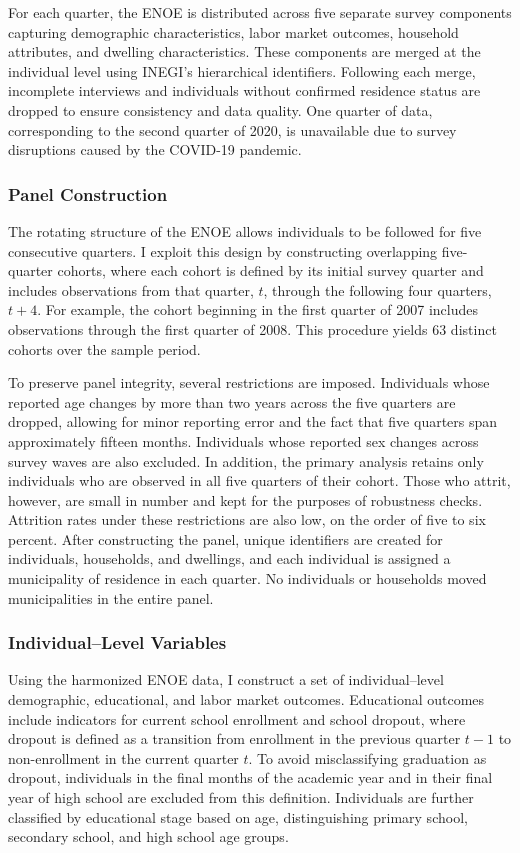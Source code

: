\documentclass[12pt,letter,english,intoc,bibliography=totoc,index=totoc,BCOR10mm,captions=tableheading,nottitlepage,fleqn]{article}
\theoremstyle{break}
\begin{document}
For each quarter, the ENOE is distributed across five separate survey components capturing demographic characteristics, labor market outcomes, household attributes, and dwelling characteristics. These components are merged at the individual level using INEGI's hierarchical identifiers. Following each merge, incomplete interviews and individuals without confirmed residence status are dropped to ensure consistency and data quality. One quarter of data, corresponding to the second quarter of 2020, is unavailable due to survey disruptions caused by the COVID-19 pandemic.

\subsubsection*{Panel Construction}
The rotating structure of the ENOE allows individuals to be followed for five consecutive quarters. I exploit this design by constructing overlapping five-quarter cohorts, where each cohort is defined by its initial survey quarter and includes observations from that quarter, $t$, through the following four quarters, $t+4$. For example, the cohort beginning in the first quarter of 2007 includes observations through the first quarter of 2008. This procedure yields 63 distinct cohorts over the sample period.

To preserve panel integrity, several restrictions are imposed. Individuals whose reported age changes by more than two years across the five quarters are dropped, allowing for minor reporting error and the fact that five quarters span approximately fifteen months. Individuals whose reported sex changes across survey waves are also excluded. In addition, the primary analysis retains only individuals who are observed in all five quarters of their cohort. Those who attrit, however, are small in number and kept for the purposes of robustness checks.  Attrition rates under these restrictions are also low, on the order of five to six percent. After constructing the panel, unique identifiers are created for individuals, households, and dwellings, and each individual is assigned a municipality of residence in each quarter. No individuals or households moved municipalities in the entire panel.

\subsubsection*{Individual--Level Variables}
Using the harmonized ENOE data, I construct a set of individual--level demographic, educational, and labor market outcomes. Educational outcomes include indicators for current school enrollment and school dropout, where dropout is defined as a transition from enrollment in the previous quarter $t-1$ to non-enrollment in the current quarter $t$. To avoid misclassifying graduation as dropout, individuals in the final months of the academic year and in their final year of high school are excluded from this definition. Individuals are further classified by educational stage based on age, distinguishing primary school, secondary school, and high school age groups.
\end{document}
